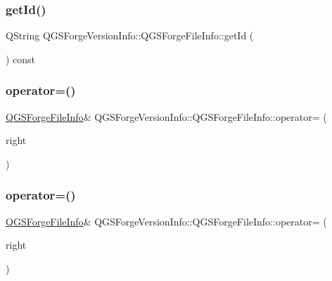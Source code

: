 \subsubsection{\texorpdfstring{get\+Id()}{getId()}}
{\footnotesize\ttfamily Q\+String Q\+G\+S\+Forge\+Version\+Info\+::\+Q\+G\+S\+Forge\+File\+Info\+::get\+Id (\begin{DoxyParamCaption}{ }\end{DoxyParamCaption}) const}

\mbox{\label{class_q_g_s_forge_version_info_1_1_q_g_s_forge_file_info_a13b1f0eff5490c907bdc4adfebd71813}} 
\subsubsection{\texorpdfstring{operator=()}{operator=()}\hspace{0.1cm}{\footnotesize\ttfamily [1/2]}}
{\footnotesize\ttfamily \mbox{\hyperlink{class_q_g_s_forge_version_info_1_1_q_g_s_forge_file_info}{Q\+G\+S\+Forge\+File\+Info}}\& Q\+G\+S\+Forge\+Version\+Info\+::\+Q\+G\+S\+Forge\+File\+Info\+::operator= (\begin{DoxyParamCaption}\item[{const \mbox{\hyperlink{class_q_g_s_forge_version_info_1_1_q_g_s_forge_file_info}{Q\+G\+S\+Forge\+File\+Info}} \&}]{right }\end{DoxyParamCaption})\hspace{0.3cm}{\ttfamily [default]}}

\mbox{\label{class_q_g_s_forge_version_info_1_1_q_g_s_forge_file_info_a0bd3e8a560c881089db47d833ccce67e}} 
\subsubsection{\texorpdfstring{operator=()}{operator=()}\hspace{0.1cm}{\footnotesize\ttfamily [2/2]}}
{\footnotesize\ttfamily \mbox{\hyperlink{class_q_g_s_forge_version_info_1_1_q_g_s_forge_file_info}{Q\+G\+S\+Forge\+File\+Info}}\& Q\+G\+S\+Forge\+Version\+Info\+::\+Q\+G\+S\+Forge\+File\+Info\+::operator= (\begin{DoxyParamCaption}\item[{\mbox{\hyperlink{class_q_g_s_forge_version_info_1_1_q_g_s_forge_file_info}{Q\+G\+S\+Forge\+File\+Info}} \&\&}]{right }\end{DoxyParamCaption})\hspace{0.3cm}{\ttfamily [default]}}


